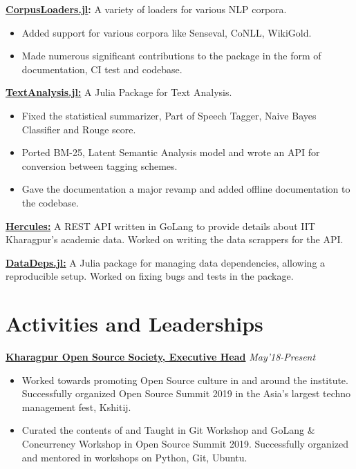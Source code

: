 \documentclass[a4paper,10pt]{extarticle} %
\begin{document}
\textbf{\href{https://github.com/JuliaText/CorpusLoaders.jl}{CorpusLoaders.jl}:} A variety of loaders for various NLP corpora.
    \begin{itemize}[leftmargin=.2in]
        \item Added support for various corpora like Senseval, CoNLL, WikiGold.
        \item Made numerous significant contributions to the package in the form of documentation, CI test and codebase.
    \end{itemize}
\textbf{\href{https://github.com/JuliaText/TextAnalysis.jl}{TextAnalysis.jl:}} A Julia Package for Text Analysis.
    \begin{itemize}[leftmargin=.2in]
        \item Fixed the statistical summarizer, Part of Speech Tagger, Naive Bayes Classifier and Rouge score.
        \item Ported BM-25, Latent Semantic Analysis model and wrote an API for conversion between tagging schemes.
        \item Gave the documentation a major revamp and added offline documentation to the codebase.
    \end{itemize}

\textbf{\href{https://github.com/kshitij10496/hercules/}{Hercules:}} A REST API written in GoLang to provide details about IIT Kharagpur's academic data. Worked on writing the data scrappers for the API.

\textbf{\href{https://github.com/oxinabox/DataDeps.jl}{DataDeps.jl:}} A Julia package for managing data dependencies, allowing a reproducible setup. Worked on fixing bugs and tests in the package.


\section{\textcolor{primary}{Activities and Leaderships}}


    \textbf{\href{https://kossiitkgp.in/}{Kharagpur Open Source Society, Executive Head}} \hfill\textit{\small{May'18-Present}}
    \begin{itemize}[leftmargin=.15in]
        \item Worked towards promoting Open Source culture in and around the institute. Successfully organized Open Source Summit 2019 in the Asia's largest techno management fest, Kshitij.
        \item Curated the contents of and Taught in Git Workshop and GoLang \& Concurrency Workshop in Open Source Summit 2019. Successfully organized and mentored in workshops on Python, Git, Ubuntu.
    \end{itemize}
\end{document}

